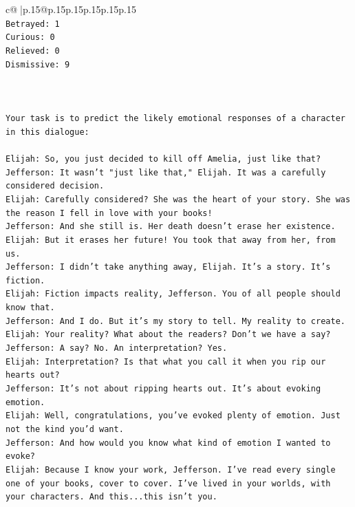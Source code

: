 \documentclass{article}
\begin{document}
{\begin{supertabular}{c@{$\;$}|p{.15\linewidth}@{}p{.15\linewidth}p{.15\linewidth}p{.15\linewidth}p{.15\linewidth}p{.15\linewidth}}
{{{\\ 
\texttt{Betrayed: 1} \\
\texttt{Curious: 0} \\
\texttt{Relieved: 0} \\
\texttt{Dismissive: 9} \\
\\ 
\\ 
\\ 
\texttt{Your task is to predict the likely emotional responses of a character in this dialogue:} \\
\\ 
\texttt{Elijah: So, you just decided to kill off Amelia, just like that?} \\
\texttt{Jefferson: It wasn't "just like that," Elijah. It was a carefully considered decision.} \\
\texttt{Elijah: Carefully considered? She was the heart of your story. She was the reason I fell in love with your books!} \\
\texttt{Jefferson: And she still is. Her death doesn't erase her existence.} \\
\texttt{Elijah: But it erases her future! You took that away from her, from us.} \\
\texttt{Jefferson: I didn't take anything away, Elijah. It's a story. It's fiction.} \\
\texttt{Elijah: Fiction impacts reality, Jefferson. You of all people should know that.} \\
\texttt{Jefferson: And I do. But it's my story to tell. My reality to create.} \\
\texttt{Elijah: Your reality? What about the readers? Don't we have a say?} \\
\texttt{Jefferson: A say? No. An interpretation? Yes.} \\
\texttt{Elijah: Interpretation? Is that what you call it when you rip our hearts out?} \\
\texttt{Jefferson: It's not about ripping hearts out. It's about evoking emotion.} \\
\texttt{Elijah: Well, congratulations, you've evoked plenty of emotion. Just not the kind you'd want.} \\
\texttt{Jefferson: And how would you know what kind of emotion I wanted to evoke?} \\
\texttt{Elijah: Because I know your work, Jefferson. I've read every single one of your books, cover to cover. I've lived in your worlds, with your characters. And this...this isn't you.} \\
}}}
\end{supertabular}}
\end{document}
